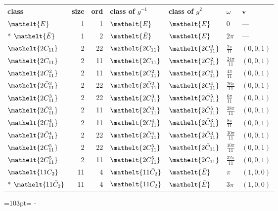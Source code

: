 \documentclass[10pt,a4paper]{article}
\newcommand{\needspace}[1]{\par\penalty-100\begingroup\dimen0=#1\relax\dimen2=\pagegoal
  \advance\dimen2-\pagetotal\ifdim\dimen0>\dimen2\relax\ifdim\dimen2>0pt\vfil\break\fi\fi
  \endgroup}
\numberwithin{equation}{section}
\newcommand{\eltfont}[1]{{\let\sigma\eltsigma\mathelt{#1}}}
\newcommand{\cls}[1]{\eltfont{#1}}
\newcommand{\dirvec}[3]{(#1, #2, #3)}
\newcommand{\vv}{\mathbf{v}}
\newcommand{\barred}[1]{\bar{#1}}
\begin{document}
{\renewcommand{\arraystretch}{1.3}\begin{longtable}{@{}lrrllll@{}}\toprule
class & size & ord & class of $g^{-1}$ & class of $g^{2}$ & $\omega$ & $\vv$\\\midrule\endhead
\bottomrule\endfoot\endlastfoot
$\cls{E}$ & 1 & 1 & $\cls{E}$ & $\cls{E}$ & $0$ & ---\\*
$\cls{\barred{E}}$ & 1 & 2 & $\cls{\barred{E}}$ & $\cls{E}$ & $2\pi$ & ---\\
$\cls{2C_{11}}$ & 2 & 22 & $\cls{2C_{11}}$ & $\cls{2C_{11}^{2}}$ & $\tfrac{2\pi}{11}$ & $\dirvec{0}{0}{1}$\\
$\cls{2\barred{C}_{11}}$ & 2 & 11 & $\cls{2\barred{C}_{11}}$ & $\cls{2C_{11}^{2}}$ & $\tfrac{24\pi}{11}$ & $\dirvec{0}{0}{1}$\\
$\cls{2C_{11}^{2}}$ & 2 & 11 & $\cls{2C_{11}^{2}}$ & $\cls{2C_{11}^{4}}$ & $\tfrac{4\pi}{11}$ & $\dirvec{0}{0}{1}$\\
$\cls{2\barred{C}_{11}^{2}}$ & 2 & 22 & $\cls{2\barred{C}_{11}^{2}}$ & $\cls{2C_{11}^{4}}$ & $\tfrac{26\pi}{11}$ & $\dirvec{0}{0}{1}$\\
$\cls{2C_{11}^{3}}$ & 2 & 22 & $\cls{2C_{11}^{3}}$ & $\cls{2\barred{C}_{11}^{5}}$ & $\tfrac{6\pi}{11}$ & $\dirvec{0}{0}{1}$\\
$\cls{2\barred{C}_{11}^{3}}$ & 2 & 11 & $\cls{2\barred{C}_{11}^{3}}$ & $\cls{2\barred{C}_{11}^{5}}$ & $\tfrac{28\pi}{11}$ & $\dirvec{0}{0}{1}$\\
$\cls{2C_{11}^{4}}$ & 2 & 11 & $\cls{2C_{11}^{4}}$ & $\cls{2\barred{C}_{11}^{3}}$ & $\tfrac{8\pi}{11}$ & $\dirvec{0}{0}{1}$\\
$\cls{2\barred{C}_{11}^{4}}$ & 2 & 22 & $\cls{2\barred{C}_{11}^{4}}$ & $\cls{2\barred{C}_{11}^{3}}$ & $\tfrac{30\pi}{11}$ & $\dirvec{0}{0}{1}$\\
$\cls{2C_{11}^{5}}$ & 2 & 22 & $\cls{2C_{11}^{5}}$ & $\cls{2\barred{C}_{11}}$ & $\tfrac{10\pi}{11}$ & $\dirvec{0}{0}{1}$\\
$\cls{2\barred{C}_{11}^{5}}$ & 2 & 11 & $\cls{2\barred{C}_{11}^{5}}$ & $\cls{2\barred{C}_{11}}$ & $\tfrac{32\pi}{11}$ & $\dirvec{0}{0}{1}$\\
$\cls{11C_{2}}$ & 11 & 4 & $\cls{11\barred{C}_{2}}$ & $\cls{\barred{E}}$ & $\pi$ & $\dirvec{1}{0}{0}$\\*
$\cls{11\barred{C}_{2}}$ & 11 & 4 & $\cls{11C_{2}}$ & $\cls{\barred{E}}$ & $3\pi$ & $\dirvec{1}{0}{0}$\\
\bottomrule\end{longtable}}
\needspace{103pt}
\end{document}

